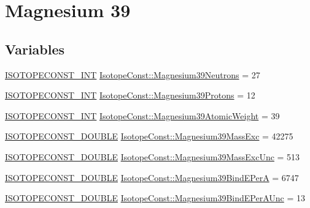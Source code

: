 \hypertarget{group___isotope_const-_magnesium-_mg39}{}\section{Magnesium 39}
\label{group___isotope_const-_magnesium-_mg39}
\subsection*{Variables}
\begin{DoxyCompactItemize}
\item 
\mbox{\hyperlink{group___isotope_const-_macros_ga5f18360b3e99483a35c32d789e62621c}{I\+S\+O\+T\+O\+P\+E\+C\+O\+N\+S\+T\+\_\+\+I\+NT}} \mbox{\hyperlink{group___isotope_const-_magnesium-_mg39_ga95b852bce734e581cdfef6c43ba04d25}{Isotope\+Const\+::\+Magnesium39\+Neutrons}} = 27
\item 
\mbox{\hyperlink{group___isotope_const-_macros_ga5f18360b3e99483a35c32d789e62621c}{I\+S\+O\+T\+O\+P\+E\+C\+O\+N\+S\+T\+\_\+\+I\+NT}} \mbox{\hyperlink{group___isotope_const-_magnesium-_mg39_ga30fccc4aea21be54cfb5aa1889aeffb6}{Isotope\+Const\+::\+Magnesium39\+Protons}} = 12
\item 
\mbox{\hyperlink{group___isotope_const-_macros_ga5f18360b3e99483a35c32d789e62621c}{I\+S\+O\+T\+O\+P\+E\+C\+O\+N\+S\+T\+\_\+\+I\+NT}} \mbox{\hyperlink{group___isotope_const-_magnesium-_mg39_ga85b6a0e7c0615e2a0973265661142660}{Isotope\+Const\+::\+Magnesium39\+Atomic\+Weight}} = 39
\item 
\mbox{\hyperlink{group___isotope_const-_macros_ga8f45a7272ce02c0b4c65c44636ed719a}{I\+S\+O\+T\+O\+P\+E\+C\+O\+N\+S\+T\+\_\+\+D\+O\+U\+B\+LE}} \mbox{\hyperlink{group___isotope_const-_magnesium-_mg39_ga3cc6044daf5f8fedd7d50b31c9613a70}{Isotope\+Const\+::\+Magnesium39\+Mass\+Exc}} = 42275
\item 
\mbox{\hyperlink{group___isotope_const-_macros_ga8f45a7272ce02c0b4c65c44636ed719a}{I\+S\+O\+T\+O\+P\+E\+C\+O\+N\+S\+T\+\_\+\+D\+O\+U\+B\+LE}} \mbox{\hyperlink{group___isotope_const-_magnesium-_mg39_ga17ef0af1825cecdc8be707285ceeab93}{Isotope\+Const\+::\+Magnesium39\+Mass\+Exc\+Unc}} = 513
\item 
\mbox{\hyperlink{group___isotope_const-_macros_ga8f45a7272ce02c0b4c65c44636ed719a}{I\+S\+O\+T\+O\+P\+E\+C\+O\+N\+S\+T\+\_\+\+D\+O\+U\+B\+LE}} \mbox{\hyperlink{group___isotope_const-_magnesium-_mg39_ga2ec4aecc736f1cb85f1fa20f48a15331}{Isotope\+Const\+::\+Magnesium39\+Bind\+E\+PerA}} = 6747
\item 
\mbox{\hyperlink{group___isotope_const-_macros_ga8f45a7272ce02c0b4c65c44636ed719a}{I\+S\+O\+T\+O\+P\+E\+C\+O\+N\+S\+T\+\_\+\+D\+O\+U\+B\+LE}} \mbox{\hyperlink{group___isotope_const-_magnesium-_mg39_ga859471a6eb4351041543ca10057c6421}{Isotope\+Const\+::\+Magnesium39\+Bind\+E\+Per\+A\+Unc}} = 13

\end{DoxyCompactItemize}
